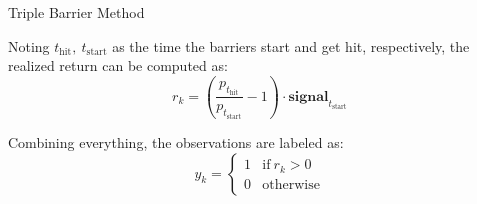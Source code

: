 \documentclass{beamer} %
\begin{document}
\begin{frame}{Triple Barrier Method}

Noting $t_{\text{hit}},\ t_{\text{start}}$ as the time the barriers 
start and get hit, respectively, the realized return can be computed 
as:
	\begin{equation*}
		r_k = \left( \frac{p_{t_{\text{hit}}}}{p_{t_{\text{start}}}} 
		- 1 \right) \cdot \textbf{signal}_{t_{\text{start}}}
	\end{equation*}
	
	Combining everything, the observations are labeled as:
	\begin{equation*}
		y_k =
	    \begin{cases}
	      1 & \text{if}\ r_k > 0 \\
	      0 & \text{otherwise}
	    \end{cases}
	\end{equation*}

\end{frame}
\end{document}
